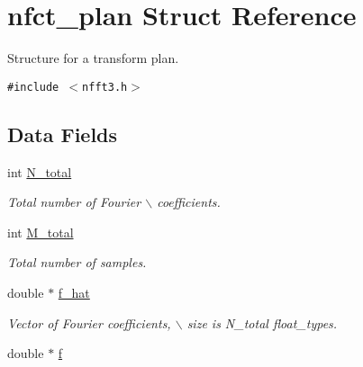 \hypertarget{structnfct__plan}{
\section{nfct\_\-plan Struct Reference}
\label{structnfct__plan}
}
Structure for a transform plan.  


{\tt \#include $<$nfft3.h$>$}

\subsection*{Data Fields}
\begin{CompactItemize}
\item 
\hypertarget{structnfct__plan_bc66ae61c54a049868c62288623d4a6b}{
int \hyperlink{structnfct__plan_bc66ae61c54a049868c62288623d4a6b}{N\_\-total}}
\label{structnfct__plan_bc66ae61c54a049868c62288623d4a6b}

\begin{CompactList}\small\item\em Total number of Fourier $\backslash$ coefficients. \item\end{CompactList}\item 
\hypertarget{structnfct__plan_b201c4e89753b167954e7cb5f34a321d}{
int \hyperlink{structnfct__plan_b201c4e89753b167954e7cb5f34a321d}{M\_\-total}}
\label{structnfct__plan_b201c4e89753b167954e7cb5f34a321d}

\begin{CompactList}\small\item\em Total number of samples. \item\end{CompactList}\item 
\hypertarget{structnfct__plan_f289164b09e85f75e8ed0eb3ded40d9c}{
double $\ast$ \hyperlink{structnfct__plan_f289164b09e85f75e8ed0eb3ded40d9c}{f\_\-hat}}
\label{structnfct__plan_f289164b09e85f75e8ed0eb3ded40d9c}

\begin{CompactList}\small\item\em Vector of Fourier coefficients, $\backslash$ size is N\_\-total float\_\-types. \item\end{CompactList}\item 
\hypertarget{structnfct__plan_cca00284f93bd33c00a1b099a6eec8cd}{
double $\ast$ \hyperlink{structnfct__plan_cca00284f93bd33c00a1b099a6eec8cd}{f}}
\label{structnfct__plan_cca00284f93bd33c00a1b099a6eec8cd}


\end{CompactItemize}
